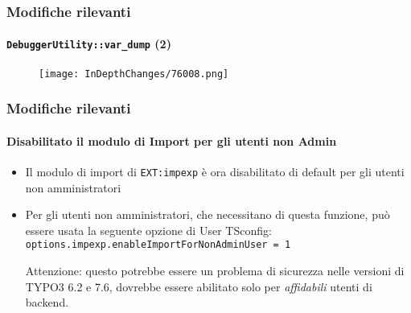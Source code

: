 \begin{frame}[fragile]
	\frametitle{Modifiche rilevanti}
	\framesubtitle{\texttt{DebuggerUtility::var\_dump} (2)}

	\begin{figure}
		\texttt{[image: InDepthChanges/76008.png]}
	\end{figure}

\end{frame}

\begin{frame}[fragile]
	\frametitle{Modifiche rilevanti}
	\framesubtitle{Disabilitato il modulo di Import per gli utenti non Admin}

	\begin{itemize}

		\item Il modulo di import di \texttt{EXT:impexp} è ora disabilitato di default per gli utenti non amministratori

		\item Per gli utenti non amministratori, che necessitano di questa funzione, può essere usata la seguente opzione di 
			User TSconfig:\newline
			\texttt{options.impexp.enableImportForNonAdminUser = 1}

			\vspace{0.5cm}

			\begingroup
				\color{typo3red}
				Attenzione: questo potrebbe essere un problema di sicurezza nelle versioni di TYPO3 6.2 e 7.6,
				dovrebbe essere abilitato solo per \textit{affidabili} utenti di backend.
			\endgroup

	\end{itemize}

\end{frame}

